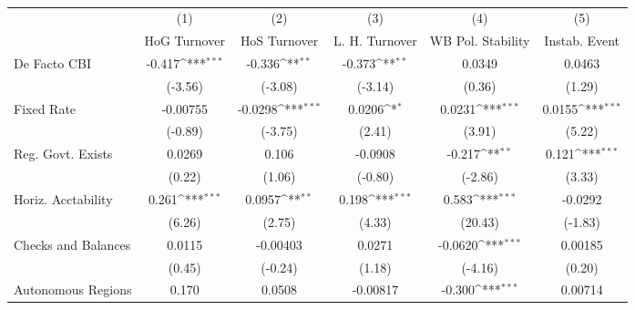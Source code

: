 \begin{table}[htbp]\centering
\def\sym#1{\ifmmode^{#1}\else\(^{#1}\)\fi}
\caption{\label{nccmultIndOLSDF}}
\begin{tabular}{l*{5}{c}}
\toprule
                                        &\multicolumn{1}{c}{(1)}&\multicolumn{1}{c}{(2)}&\multicolumn{1}{c}{(3)}&\multicolumn{1}{c}{(4)}&\multicolumn{1}{c}{(5)}\\
                                        &\multicolumn{1}{c}{HoG Turnover}&\multicolumn{1}{c}{HoS Turnover}&\multicolumn{1}{c}{L. H. Turnover}&\multicolumn{1}{c}{WB Pol. Stability}&\multicolumn{1}{c}{Instab. Event}\\
\midrule
De Facto CBI                            &   -0.417\sym{***}&   -0.336\sym{**} &   -0.373\sym{**} &   0.0349         &   0.0463         \\
                                        &  (-3.56)         &  (-3.08)         &  (-3.14)         &   (0.36)         &   (1.29)         \\
\addlinespace
Fixed Rate                              & -0.00755         &  -0.0298\sym{***}&   0.0206\sym{*}  &   0.0231\sym{***}&   0.0155\sym{***}\\
                                        &  (-0.89)         &  (-3.75)         &   (2.41)         &   (3.91)         &   (5.22)         \\
\addlinespace
Reg. Govt. Exists                       &   0.0269         &    0.106         &  -0.0908         &   -0.217\sym{**} &    0.121\sym{***}\\
                                        &   (0.22)         &   (1.06)         &  (-0.80)         &  (-2.86)         &   (3.33)         \\
\addlinespace
Horiz. Acctability                      &    0.261\sym{***}&   0.0957\sym{**} &    0.198\sym{***}&    0.583\sym{***}&  -0.0292         \\
                                        &   (6.26)         &   (2.75)         &   (4.33)         &  (20.43)         &  (-1.83)         \\
\addlinespace
Checks and Balances                     &   0.0115         & -0.00403         &   0.0271         &  -0.0620\sym{***}&  0.00185         \\
                                        &   (0.45)         &  (-0.24)         &   (1.18)         &  (-4.16)         &   (0.20)         \\
\addlinespace
Autonomous Regions                      &    0.170         &   0.0508         & -0.00817         &   -0.300\sym{***}&  0.00714         \\

\end{tabular}
\end{table}
